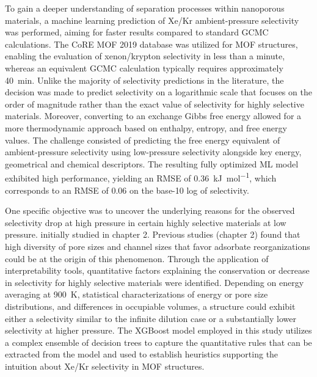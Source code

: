 \documentclass[main]{subfiles}
\begin{document}
To gain a deeper understanding of separation processes within nanoporous materials, a machine learning prediction of Xe/Kr ambient-pressure selectivity was performed, aiming for faster results compared to standard GCMC calculations. The CoRE MOF 2019 database was utilized for MOF structures, enabling the evaluation of xenon/krypton selectivity in less than a minute, whereas an equivalent GCMC calculation typically requires approximately \SI{40}{\minute}. 
Unlike the majority of selectivity predictions in the literature, the decision was made to predict selectivity on a logarithmic scale that focuses on the order of magnitude rather than the exact value of selectivity for highly selective materials. Moreover, converting to an exchange Gibbs free energy allowed for a more thermodynamic approach based on enthalpy, entropy, and free energy values. The challenge consisted of predicting the free energy equivalent of ambient-pressure selectivity using low-pressure selectivity alongside key energy, geometrical and chemical descriptors. The resulting fully optimized ML model exhibited high performance, yielding an RMSE of \SI{0.36}{\kilo\joule\per\mole}, which corresponds to an RMSE of $0.06$ on the base-10 log of selectivity.

One specific objective was to uncover the underlying reasons for the observed selectivity drop at high pressure in certain highly selective materials at low pressure. initially studied in chapter 2. Previous studies (chapter 2) found that high diversity of pore sizes and channel sizes that favor adsorbate reorganizations could be at the origin of this phenomenon. Through the application of interpretability tools, quantitative factors explaining the conservation or decrease in selectivity for highly selective materials were identified. Depending on energy averaging at \SI{900}{\kelvin}, statistical characterizations of energy or pore size distributions, and differences in occupiable volumes, a structure could exhibit either a selectivity similar to the infinite dilution case or a substantially lower selectivity at higher pressure. The XGBoost model employed in this study utilizes a complex ensemble of decision trees to capture the quantitative rules that can be extracted from the model and used to establish heuristics supporting the intuition about Xe/Kr selectivity in MOF structures.
\end{document}
